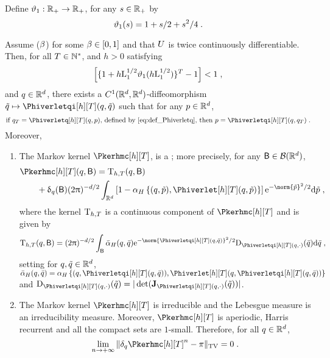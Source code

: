   Define $\vartheta_1 : \mathbb{R}_+ \to \mathbb{R}_+$, for any $s \in \mathbb{R}_+$ by
  \begin{equation}
    \label{eq:def_vartheta_1}
    \vartheta_1(s) = 1+  s/2 + s^2/4\;.
  \end{equation}
\begin{theorem}
  \label{theo:irred_harris}
Assume ($\beta$) for some $\beta \in \left[0,1\right]$ and that $U$ is twice continuously
differentiable. Then, for all $T \in \mathbb{N}^{*}$, and  $h > 0$ satisfying
\begin{equation}
\label{eq:condition-h,T-harris}
 \left[ \{1 + h\mathrm{L}_1^{1/2} \vartheta_1(h\mathrm{L}_1^{1/2}) \}^T - 1 \right] < 1 \;,
\end{equation}
and $q \in \mathbb{R}^d$, there exists a $C^1(\mathbb{R}^d,\mathbb{R}^d)$-diffeomorphism $\tilde{q} \mapsto \Phiverletqi[h][T](q,\tilde{q})$ such that for any $p \in \mathbb{R}^d$,
\begin{equation}
\label{theo:irred_harris_a}
\text{if $q_T =   \Phiverletq[h][T](q,p)$, defined by \eqref{eq:def_Phiverletq}, then $p = \Phiverletqi[h][T](q,q_T)$} \eqsp.
\end{equation}
Moreover,
\begin{enumerate}[label=(\roman*), wide, labelwidth=!, labelindent=0pt]
\item   \label{theo:irred_harris_b}
The Markov kernel $\Pkerhmc[h][T]$, is a \Tkernel; more precisely, for any $\mathsf{B} \in \mathcal{B}(\mathbb{R}^d)$,
\begin{align}
\label{eq:def_kernel_hmc_false_density}
&\Pkerhmc[h][T](q, \eventB) =  \Tker_{h,T}(q,\eventB) \\
&\qquad + \updelta_{q}(\eventB)(2 \uppi)^{-d/2} \int_{\rset^d}  \parentheseDeux{1-\alphaacc\defEns{(q,\tilde{p}),\Phiverlet[h][T](q,\tilde{p})}} \rme^{-\norm{\tilde{p}}^2/2} \rmd \tilde{p} \eqsp,
\end{align}
where the kernel $ \mathrm{T}_{h,T}$ is a continuous component of $\Pkerhmc[h][T]$  and is given by
\begin{equation}
  \label{eq:def_tker}
\Tker_{h,T}(q,\eventB)
  =   (2 \uppi)^{-d/2} \int_{\eventB}    \balphaacc(q,\bar{q})\rme^{-\norm{\Phiverletqi[h][T](q,\bar{q})}^2/2} \detj_{\Phiverletqi[h][T](q,\cdot)}(\bar{q})  \rmd \bar{q} \eqsp,
\end{equation}
setting for $q,\tilde{q} \in \mathbb{R}^d$, $\balphaacc(q,\bar{q}) =  \alphaacc\defEns{(q,\Phiverletqi[h][T](q,\bar{q})),\Phiverlet[h][T](q,\Phiverletqi[h][T](q,\bar{q}))}$ and  $\detj_{\Phiverletqi[h][T](q,\cdot)}(\tilde{q}) = \absLigne{\det(\Jac_{\Phiverletqi[h][T](q,\cdot)}(\tilde{q}))}$.
\item \label{theo:irred_harris_c} The Markov kernel $\Pkerhmc[h][T]$ is irreducible and the Lebesgue measure is an irreducibility measure. Moreover,  $\Pkerhmc[h][T]$ is aperiodic, Harris recurrent and all the compact sets are $1$-small. Therefore, for all $q \in \mathbb{R}^d$,
\begin{equation}
\label{eq:harris-theorem}
\lim_{n \to \plusinfty}    \tvnorm{\delta_\q \Pkerhmc[h][T]^n - \pi} = 0 \eqsp.
\end{equation}
\end{enumerate}
\end{theorem}

